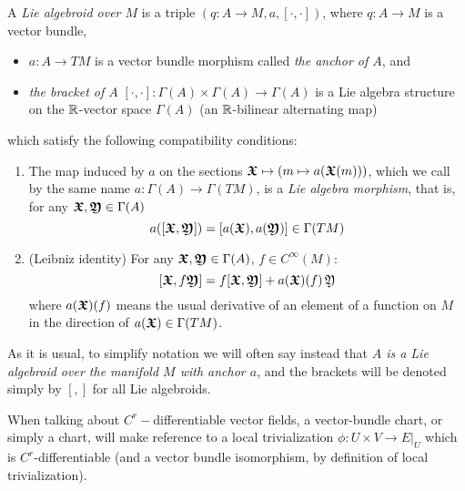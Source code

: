 \begin{definition} \label{defnLieAlgoid}
A \emph{Lie algebroid over $M$} is a triple $(q:A \to M, a, [\cdot, \cdot ])$, where $q:A \to M$ is a vector bundle, 
    \begin{itemize}
    \item $a:A \to TM$ is a vector bundle morphism called \emph{the anchor of $A$}, and
    \item \emph{the bracket of $A$} $[\cdot, \cdot ]: \Gamma(A) \times \Gamma(A) \to \Gamma(A)$ is a Lie algebra structure on the $\mathbb{R}$-vector space $\Gamma(A)$ (an $\mathbb{R}$-bilinear alternating map) 
    \end{itemize}  which satisfy the following compatibility conditions:

\begin{enumerate}
    \item The map induced by $a$ on the sections $\bm{\mathfrak{X}} \mapsto (m \mapsto a(\bm{\mathfrak{X}}(m)))$, which we call by the same name $a:\Gamma(A) \to \Gamma(TM)$, is a \emph{Lie algebra morphism}, that is, for any $\bm{\mathfrak{X}}, \bm{\mathfrak{Y}} \in \Gamma(A)$ \[ a([\bm{\mathfrak{X}}, \bm{\mathfrak{Y}}])  = [a(\bm{\mathfrak{X}}), a(\bm{\mathfrak{Y}})] \in  \Gamma(TM)\]
    
    \item (Leibniz identity) For any $\bm{\mathfrak{X}}, \bm{\mathfrak{Y}} \in \Gamma(A)$, $f \in C^\infty (M)$: \[ [\bm{\mathfrak{X}}, f\bm{\mathfrak{Y}}] = f[\bm{\mathfrak{X}}, \bm{\mathfrak{Y}}] + a(\bm{\mathfrak{X}})(f)\, \mathfrak{Y} \] where $a(\bm{\mathfrak{X}})(f)$ means the usual derivative of an element of a function on $M$ in the direction of $a(\bm{\mathfrak{X}}) \in \Gamma(TM)$.
\end{enumerate}
\end{definition}

As it is usual, to simplify notation we will often say instead that \emph{$A$ is a Lie algebroid over the manifold $M$ with anchor $a$}, and the brackets will be denoted simply by $[,]$ for all Lie algebroids.

When talking about $C^r-$differentiable vector fields, a vector-bundle chart, or simply a chart, will make reference to a local trivialization $\phi: U \times V \to E|_U$ which is $C^r$-differentiable (and a vector bundle isomorphism, by definition of local trivialization).


